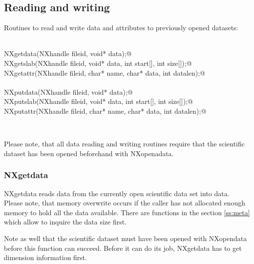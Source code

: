 \documentclass[12pt]{article}
\begin{document}
\subsection{Reading and writing}
\label{ss:rw}

Routines to read and write data and attributes to previously opened datasets:

\begin{flushleft} \small
\begin{minipage}{\linewidth} \label{scrap12}
\vspace{-1ex}
\begin{list}{}{} \item
\mbox{}\verb@@\\
\mbox{}\verb@NXstatus  NXgetdata(NXhandle fileid, void* data);@\\
\mbox{}\verb@NXstatus  NXgetslab(NXhandle fileid, void* data, int start[], int size[]);@\\
\mbox{}\verb@NXstatus  NXgetattr(NXhandle fileid, char* name, char* data, int datalen);@\\
\mbox{}\verb@@\\
\mbox{}\verb@NXstatus  NXputdata(NXhandle fileid, void* data);@\\
\mbox{}\verb@NXstatus  NXputslab(NXhandle fileid, void* data, int start[], int size[]);@\\
\mbox{}\verb@NXstatus  NXputattr(NXhandle fileid, char* name, char* data, int datalen);@\\
\end{list}
\vspace{-1ex}
\footnotesize\addtolength{\baselineskip}{-1ex}
\end{minipage}\\[4ex]
\end{flushleft}
Please note, that all data reading and writing routines require that the
scientific dataset has been opened beforehand with NXopenadata. 

\subsubsection{NXgetdata}
NXgetdata reads data from the currently open scientific data set into
data. Please note, that memory overwrite occurs if the caller has not
allocated enough memory to hold all the data available. There are functions
in the section \ref{ss:meta} which allow to inquire the data size first.

Note as well that the scientific dataset must have been opened with
NXopendata before this function can succeed. Before it can do its job,
NXgetdata has to get dimension information first.
\end{document}
